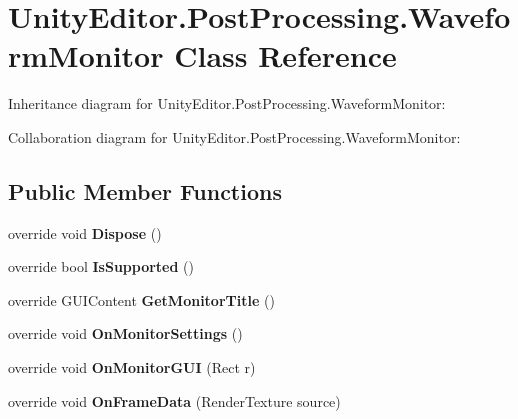 \hypertarget{class_unity_editor_1_1_post_processing_1_1_waveform_monitor}{}\section{Unity\+Editor.\+Post\+Processing.\+Waveform\+Monitor Class Reference}
\label{class_unity_editor_1_1_post_processing_1_1_waveform_monitor}


Inheritance diagram for Unity\+Editor.\+Post\+Processing.\+Waveform\+Monitor\+:


Collaboration diagram for Unity\+Editor.\+Post\+Processing.\+Waveform\+Monitor\+:
\subsection*{Public Member Functions}
\begin{DoxyCompactItemize}
\item 
\mbox{\label{class_unity_editor_1_1_post_processing_1_1_waveform_monitor_aa30204365ee9ccf878ecd5e5dafd06d8}} 
override void {\bfseries Dispose} ()
\item 
\mbox{\label{class_unity_editor_1_1_post_processing_1_1_waveform_monitor_aa2c30e921275f59d61d0f50d3804a306}} 
override bool {\bfseries Is\+Supported} ()
\item 
\mbox{\label{class_unity_editor_1_1_post_processing_1_1_waveform_monitor_a71cc6ab9e9d57a73451cdb0e86d25b79}} 
override G\+U\+I\+Content {\bfseries Get\+Monitor\+Title} ()
\item 
\mbox{\label{class_unity_editor_1_1_post_processing_1_1_waveform_monitor_a68311f67e6546f64f01f825bd0cdff5a}} 
override void {\bfseries On\+Monitor\+Settings} ()
\item 
\mbox{\label{class_unity_editor_1_1_post_processing_1_1_waveform_monitor_acdc2fa129a9020c11b49e4ed3c47f80d}} 
override void {\bfseries On\+Monitor\+G\+UI} (Rect r)
\item 
\mbox{\label{class_unity_editor_1_1_post_processing_1_1_waveform_monitor_a8a2597c0eedeeb0f5451ca10edc1c241}} 
override void {\bfseries On\+Frame\+Data} (Render\+Texture source)
\end{DoxyCompactItemize}
